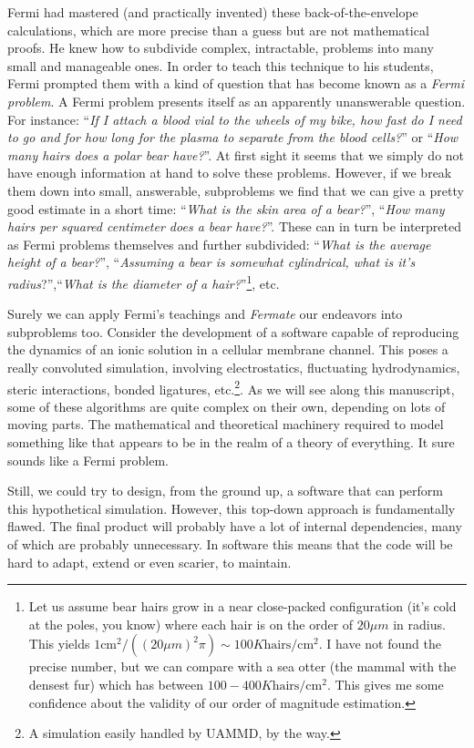 \documentclass[ twoside,openright,titlepage,numbers=noenddot,%
headinclude,footinclude,cleardoublepage=empty,abstract=on,
BCOR=5mm,paper=b5,fontsize=11pt, dvipsnames
]{scrreprt}
\newcommand{\uammd}{\gls{UAMMD}\xspace}
\begin{document}
Fermi had mastered (and practically invented) these back-of-the-envelope calculations, which are more precise than a guess but are not mathematical proofs. He knew how to subdivide complex, intractable, problems into many small and manageable ones. In order to teach this technique to his students, Fermi prompted them with a kind of question that has become known as a \emph{Fermi problem}. A Fermi problem presents itself as an apparently unanswerable question. For instance: ``\emph{If I attach a blood vial to the wheels of my bike, how fast do I need to go and for how long for the plasma to separate from the blood cells?}'' or ``\emph{How many hairs does a polar bear have?}''. At first sight it seems that we simply do not have enough information at hand to solve these problems. However, if we break them down into small, answerable, subproblems we find that we can give a pretty good estimate in a short time: ``\emph{What is the skin area of a bear?}'', ``\emph{How many hairs per squared centimeter does a bear have?}''. These can in turn be interpreted as Fermi problems themselves and further subdivided: ``\emph{What is the average height of a bear?}'', ``\emph{Assuming a bear is somewhat cylindrical, what is it's radius}?'',``\emph{What is the diameter of a hair?}''\footnote{Let us assume bear hairs grow in a near close-packed configuration (it's cold at the poles, you know) where each hair is on the order of $20\mu m$ in radius. This yields $1\text{cm}^2/((20\mu m)^2\pi) \sim 100K \text{hairs}/\text{cm}^2$. I have not found the precise number, but we can compare with a sea otter (the mammal with the densest fur) which has between $100-400K \text{hairs}/\text{cm}^2$. This gives me some confidence about the validity of our order of magnitude estimation.}, etc.

Surely we can apply Fermi's teachings and \emph{Fermate} our endeavors into subproblems too.
Consider the development of a software capable of reproducing the dynamics of an ionic solution in a cellular membrane channel. This poses a really convoluted simulation, involving electrostatics, fluctuating hydrodynamics, steric interactions, bonded ligatures, etc.\footnote{A simulation easily handled by \uammd, by the way.}. As we will see along this manuscript, some of these algorithms are quite complex on their own, depending on lots of moving parts. The mathematical and theoretical machinery required to model something like that appears to be in the realm of a theory of everything. It sure sounds like a Fermi problem.

Still, we could try to design, from the ground up, a software that can perform this hypothetical simulation. 
However, this top-down approach is fundamentally flawed. The final product will probably have a lot of internal dependencies, many of which are probably unnecessary. In software this means that the code will be hard to adapt, extend or even scarier, to maintain.
\end{document}
